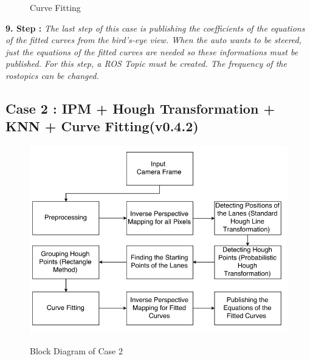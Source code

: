 \begin{figure}[H]
  \centering
  \caption{Curve Fitting}
\end{figure} 


\textbf{9. Step : }\emph{\color{blue}The last step of this case is publishing the coefficients of the equations of the fitted curves from the bird's-eye view. When the auto wants to be steered, just the equations of the fitted curves are needed so these informations must be published. For this step, a ROS Topic must be created. The frequency of the rostopics can be changed.}

%

\subsection{Case 2 : IPM + Hough Transformation + KNN + Curve Fitting(v0.4.2)}\label{sec:Case 2}

\begin{figure}[H]
 \centering
  \includegraphics[width=1\textwidth]{./Bilder/Case2_BlockDiagram.png}\label{fig:Case2_BlockDiagram}
	\caption{Block Diagram of Case 2}
\end{figure}


